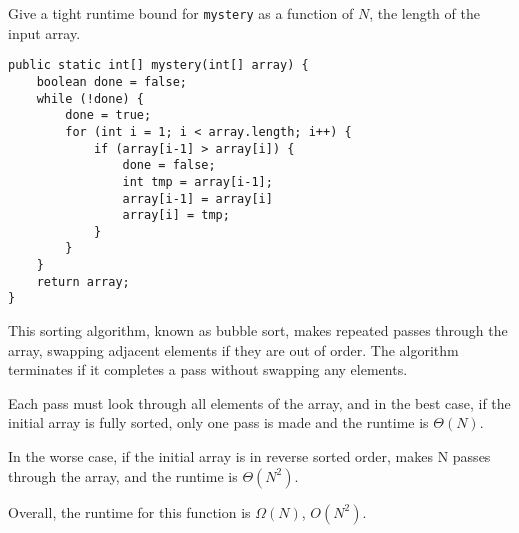\question Give a tight runtime bound for \texttt{mystery} as a function of $N$, the length of the input array.

\begin{lstlisting}
public static int[] mystery(int[] array) {
    boolean done = false;
    while (!done) {
        done = true;
        for (int i = 1; i < array.length; i++) {
            if (array[i-1] > array[i]) {
                done = false;
                int tmp = array[i-1];
                array[i-1] = array[i]
                array[i] = tmp;
            }
        }
    }
    return array;
}
\end{lstlisting}

\begin{solution}[0.5in]
This sorting algorithm, known as bubble sort, makes repeated passes through the array, swapping adjacent elements if they are out of order. The algorithm terminates if it completes a pass without swapping any elements. 

Each pass must look through all elements of the array, and in the best case, if the initial array is fully sorted, only one pass is made and the runtime is $\Theta(N)$.

In the worse case, if the initial array is in reverse sorted order, makes N passes through the array, and the runtime is $\Theta(N^2)$.

Overall, the runtime for this function is $\Omega(N)$, $O(N^2)$.
\end{solution}